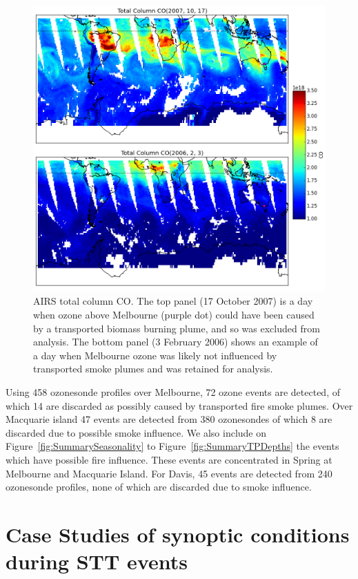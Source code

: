 \documentclass{article}
\begin{document}
    \begin{figure}[!htbp]
      \includegraphics[width=\textwidth]{figures/AIRS_compare.png}
      \caption{AIRS total column CO.
      The top panel (17 October 2007) is a day when ozone above Melbourne (purple dot) could have been caused by a transported biomass burning plume, and so was excluded from analysis.
      The bottom panel (3 February 2006) shows an example of a day when Melbourne ozone was likely not influenced by transported smoke plumes and was retained for analysis.}
      \label{fig:excludedeg}
    \end{figure}
    
    Using 458 ozonesonde profiles over Melbourne, 72 ozone events are detected, of which 14 are discarded as possibly caused by transported fire smoke plumes. 
    Over Macquarie island 47 events are detected from 380 ozonesondes of which 8 are discarded due to possible smoke influence.
    We also include on Figure~\ref{fig:SummarySeasonality} to Figure~\ref{fig:SummaryTPDepths} the events which have possible fire influence. 
    These events are concentrated in Spring at Melbourne and Macquarie Island.
    For Davis, 45 events are detected from 240 ozonesonde profiles, none of which are discarded due to smoke influence.

\section{Case Studies of synoptic conditions during STT events}
\end{document}
